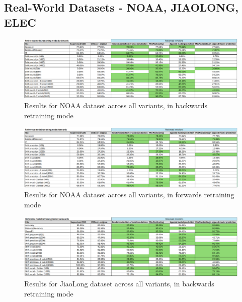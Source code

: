 \documentclass{svproc}
\begin{document}
 \subsection{Real-World Datasets - NOAA, JIAOLONG, ELEC}
  \begin{figure}
 	\includegraphics[scale=.95]{figures/Fig18_NOAA_1.png}
 	\caption{Results for NOAA dataset across all variants, in backwards retraining mode}
 	\label{fig:fig18}
 \end{figure}
 
 
 \begin{figure}
 	\centering
 	\includegraphics[scale=.95]{figures/Fig19_NOAA_2.png}
 	\caption{Results for NOAA dataset across all variants, in forwards retraining mode}
 	\label{fig:fig19}
\end{figure}
 
 
   \begin{figure}
 	\centering
 	\includegraphics[scale=.95]{figures/Fig20_JIAOLONG_1.png}
 	\caption{Results for JiaoLong dataset across all variants, in backwards retraining mode}
 	\label{fig:fig20}
 \end{figure}
 
\end{document}
